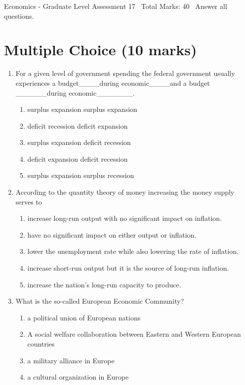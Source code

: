 \documentclass[12pt]{article}
\begin{document}
\begin{center}
Economics - Graduate Level Assessment 17 \
Total Marks: 40 \
Answer all questions.
\end{center}

\section*{Multiple Choice (10 marks)}
\begin{enumerate}[label=\arabic*.]
\item For a given level of government spending the federal government usually experiences a budget\_\_\_\_during economic\_\_\_\_and a budget \_\_\_\_\_\_during economic\_\_\_\_\_\_\_.
\begin{enumerate}[label=(\alph*)]
    \item surplus expansion surplus expansion
    \item deficit recession deficit expansion
    \item surplus expansion deficit recession
    \item deficit expansion deficit recession
    \item surplus expansion surplus recession
\end{enumerate}
\item According to the quantity theory of money increasing the money supply serves to
\begin{enumerate}[label=(\alph*)]
    \item increase long-run output with no significant impact on inflation.
    \item have no significant impact on either output or inflation.
    \item lower the unemployment rate while also lowering the rate of inflation.
    \item increase short-run output but it is the source of long-run inflation.
    \item increase the nation's long-run capacity to produce.
\end{enumerate}
\item What is the so-called European Economic Community?
\begin{enumerate}[label=(\alph*)]
    \item a political union of European nations
    \item A social welfare collaboration between Eastern and Western European countries
    \item a military alliance in Europe
    \item a cultural organization in Europe

\end{enumerate}
\end{enumerate}
\end{document}
